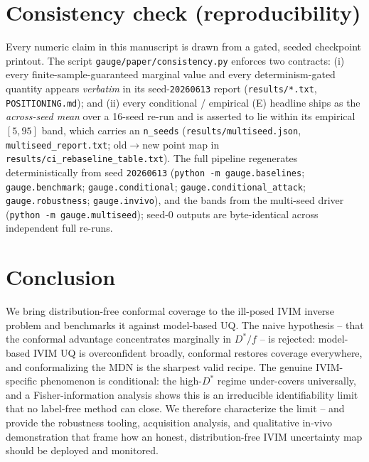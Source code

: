 \documentclass[11pt]{article}
\newcommand{\Dstar}{D^{*}}
\begin{document}
\section{Consistency check (reproducibility)}
\label{sec:consistency}
Every numeric claim in this manuscript is drawn from a gated, seeded checkpoint
printout. The script \texttt{gauge/paper/consistency.py} enforces two contracts:
(i) every finite-sample-guaranteed marginal value and every determinism-gated
quantity appears \emph{verbatim} in its seed-\texttt{20260613} report
(\texttt{results/*.txt}, \texttt{POSITIONING.md}); and (ii) every conditional /
empirical (E) headline ships as the \emph{across-seed mean} over a 16-seed re-run
and is asserted to lie within its empirical $[5,95]$ band, which carries an
\texttt{n\_seeds} (\texttt{results/multiseed.json}, \texttt{multiseed\_report.txt};
old$\to$new point map in \texttt{results/ci\_rebaseline\_table.txt}). The full
pipeline regenerates deterministically from seed \texttt{20260613}
(\texttt{python -m gauge.baselines}; \texttt{gauge.benchmark};
\texttt{gauge.conditional}; \texttt{gauge.conditional\_attack};
\texttt{gauge.robustness}; \texttt{gauge.invivo}), and the bands from the multi-seed
driver (\texttt{python -m gauge.multiseed}); seed-0 outputs are byte-identical
across independent full re-runs.

\section{Conclusion}
We bring distribution-free conformal coverage to the ill-posed IVIM inverse
problem and benchmarks it against model-based UQ. The naive hypothesis -- that the
conformal advantage concentrates marginally in $\Dstar/f$ -- is rejected:
model-based IVIM UQ is overconfident broadly, conformal restores coverage
everywhere, and conformalizing the MDN is the sharpest valid recipe. The genuine
IVIM-specific phenomenon is conditional: the high-$\Dstar$ regime under-covers
universally, and a Fisher-information analysis shows this is an irreducible
identifiability limit that no label-free method can close. We therefore characterize
the limit -- and provide the robustness tooling, acquisition analysis, and
qualitative in-vivo demonstration that frame how an honest, distribution-free IVIM
uncertainty map should be deployed and monitored.
\end{document}
